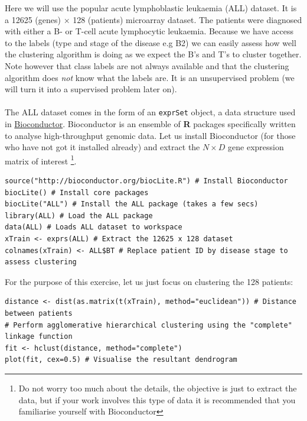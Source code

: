 \documentclass[a4paper,11pt]{article}
\begin{document}
Here we will use the popular acute lymphoblastic leukaemia (ALL) dataset. It is a
12625 (genes) $\times$ 128 (patients) microarray dataset. The patients were diagnosed with 
either a B- or T-cell acute lymphocytic leukaemia. Because we have access to the labels 
(type and stage of the disease e.g B2) we can easily assess how well the clustering 
algorithm is doing as we expect the B's and T's to cluster together. Note however 
that class labels are not always available and that the clustering algorithm 
does \textit{not} know what the labels are. It is an unsupervised problem 
(we will turn it into a supervised problem later on).
\\\\
The ALL dataset comes in the form of an {\lstinline[style=RCode, basicstyle=\normalsize\ttfamily] |exprSet|} object,
a data structure used in \href{http://www.bioconductor.org}{Bioconductor}. Bioconductor is
an ensemble of \textbf{R} packages specifically written to analyse high-throughput genomic data.
Let us install Bioconductor (for those who have not got it installed already) and extract
the $N \times D$ gene expression matrix of interest \footnote{Do not worry too much about the details, 
the objective is just to extract the data, but if your work involves this type of data it is 
recommended that you familiarise yourself with Bioconductor}.
\\
\begin{lstlisting}[style=RCode]
source("http://bioconductor.org/biocLite.R") # Install Bioconductor
biocLite() # Install core packages 
biocLite("ALL") # Install the ALL package (takes a few secs)
library(ALL) # Load the ALL package
data(ALL) # Loads ALL dataset to workspace
xTrain <- exprs(ALL) # Extract the 12625 x 128 dataset
colnames(xTrain) <- ALL$BT # Replace patient ID by disease stage to assess clustering
\end{lstlisting}
\vspace{-0.3cm}
For the purpose of this exercise, let us just focus on clustering the 128 patients:
\vspace{0.3cm}
\begin{lstlisting}[style=RCode]
distance <- dist(as.matrix(t(xTrain), method="euclidean")) # Distance between patients
# Perform agglomerative hierarchical clustering using the "complete" linkage function
fit <- hclust(distance, method="complete") 
plot(fit, cex=0.5) # Visualise the resultant dendrogram 
\end{lstlisting}
\end{document}
